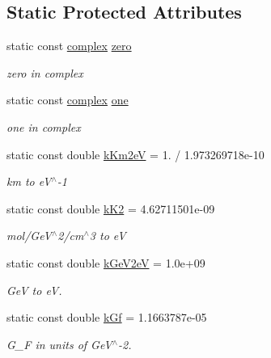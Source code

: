 \subsection*{Static Protected Attributes}
\begin{DoxyCompactItemize}
\item 
static const \hyperlink{classOscProb_1_1PMNS__Base_ae86ec4718808ce9d02e5f5b4226714ab}{complex} \hyperlink{classOscProb_1_1PMNS__Base_a5c31ed4593cf95feb36fb80c1850d25e}{zero}
\begin{DoxyCompactList}\small\item\em zero in complex \end{DoxyCompactList}\item 
static const \hyperlink{classOscProb_1_1PMNS__Base_ae86ec4718808ce9d02e5f5b4226714ab}{complex} \hyperlink{classOscProb_1_1PMNS__Base_ab64aab27448a5aca27565c991a9d173e}{one}
\begin{DoxyCompactList}\small\item\em one in complex \end{DoxyCompactList}\item 
static const double \hyperlink{classOscProb_1_1PMNS__Base_a382ddd7b76ca89b43f22614a2ea7327b}{k\+Km2eV} = 1. / 1.\+973269718e-\/10
\begin{DoxyCompactList}\small\item\em km to e\+V$^\wedge$-\/1 \end{DoxyCompactList}\item 
static const double \hyperlink{classOscProb_1_1PMNS__Base_a326fc5016d7dd7ce05682c06cdcb6d94}{k\+K2} = 4.\+62711501e-\/09
\begin{DoxyCompactList}\small\item\em mol/\+Ge\+V$^\wedge$2/cm$^\wedge$3 to eV \end{DoxyCompactList}\item 
static const double \hyperlink{classOscProb_1_1PMNS__Base_ad36a0a6bf58d6ec093d3947784bd89e9}{k\+Ge\+V2eV} = 1.\+0e+09
\begin{DoxyCompactList}\small\item\em GeV to eV. \end{DoxyCompactList}\item 
static const double \hyperlink{classOscProb_1_1PMNS__Base_a7f26a3456128234b2ae6cc9141a6532f}{k\+Gf} = 1.\+1663787e-\/05
\begin{DoxyCompactList}\small\item\em G\+\_\+F in units of Ge\+V$^\wedge$-\/2. \end{DoxyCompactList}\end{DoxyCompactItemize}


